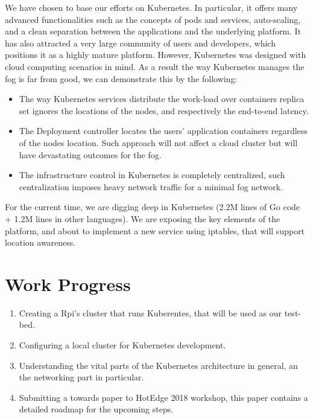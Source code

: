 \documentclass[10pt,twocolumn,letterpaper]{article}
\begin{document}
We have chosen to base our efforts on Kubernetes.  In particular, it offers many advanced functionalities such as the concepts of pods and services, auto-scaling, and a clean separation between the applications and the underlying platform. It has also attracted a very large community of users and developers, which positions it as a highly mature platform. However, Kubernetes was designed with cloud computing scenarios in mind. As a result the way Kubernetes manages the fog is far from good, we can demonstrate this by the following: 
\begin{itemize}
\item The way Kubernetes services distribute the work-load over containers replica set ignores the locations of the nodes, and  respectively the end-to-end latency.
\item The Deployment controller locates the users' application containers regardless of the nodes location. Such approach will not affect a cloud cluster but will have devastating outcomes for the fog. 
\item The infrastructure control in Kubernetes is completely centralized, such centralization imposes heavy network traffic for a minimal fog network. 
\end{itemize}

For the current time, we are digging deep in Kubernetes (2.2M lines of Go code + 1.2M lines in other languages). We are exposing the key elements of the platform, and about to implement a new service using iptables, that will support location awareness. 

\section{Work Progress}
\begin{enumerate}
\item Creating a Rpi's cluster that runs Kuberentes, that will be used as our test-bed. 
\item Configuring a local cluster for Kubernetes development.
\item Understanding the vital parts of the Kubernetes architecture in general, an the networking part in particular.
\item Submitting a towards paper to HotEdge 2018 workshop\cite{ali}, this paper contains a detailed roadmap for the upcoming steps. 
  
\end{enumerate}


{}

\end{document}
